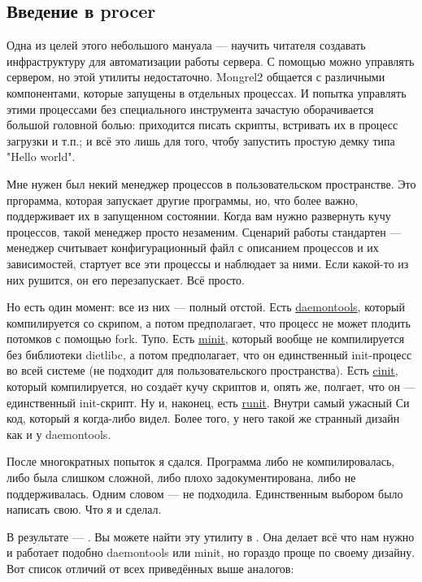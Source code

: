 \subsection{Введение в procer}

Одна из целей этого небольшого мануала --- научить читателя создавать
инфраструктуру для автоматизации работы сервера. С помощью  можно
управлять сервером, но этой утилиты недостаточно. Mongrel2 общается с различными
компонентами, которые запущены в отдельных процессах. И попытка управлять этими
процессами без специального инструмента зачастую оборачивается большой головной
болью: приходится писать скрипты, встривать их в процесс загрузки и т.п.; и всё
это лишь для того, чтобу запустить простую демку типа "Hello world".

Мне нужен был некий менеджер процессов в пользовательском пространстве. Это
пргорамма, которая запускает другие программы, но, что более важно, поддерживает
их в запущенном состоянии. Когда вам нужно развернуть кучу процессов, такой
менеджер просто незаменим. Сценарий работы стандартен --- менеджер считывает
конфигурационный файл с описанием процессов и их зависимостей, стартует все эти
процессы и наблюдает за ними. Если какой-то из них рушится, он его
перезапускает. Всё просто.

Но есть один момент: все из них --- полный отстой. Есть
\href{http://cr.yp.to/daemontools.html}{daemontools}, который компилируется со
скрипом, а потом предполагает, что процесс не может плодить потомков с помощью
fork. Тупо. Есть \href{http://www.fefe.de/minit}{minit}, который вообще не
компилируется без библиотеки dietlibc, а потом предполагает, что он единственный
init-процесс во всей системе (не подходит для пользовательского пространства).
Есть \href{http://www.nico.schottelius.org/software/cinit}{cinit}, который
компилируется, но создаёт кучу скриптов и, опять же, полгает, что он ---
единственный init-скрипт. Ну и, наконец, есть
\href{http://smarden.org/runit}{runit}. Внутри самый ужасный Си код, который я
когда-либо видел. Более того, у него такой же странный дизайн как и у
daemontools.

После многократных попыток я сдался. Программа либо не компилировалась, либо
была слишком сложной, либо плохо задокументирована, либо не поддерживалась.
Одним словом --- не подходила. Единственным выбором было написать свою. Что я и
сделал.

В результате --- . Вы можете найти эту утилиту в
. Она делает всё что нам нужно и работает подобно
daemontools или minit, но гораздо проще по своему дизайну. Вот список отличий от
всех приведённых выше аналогов:

